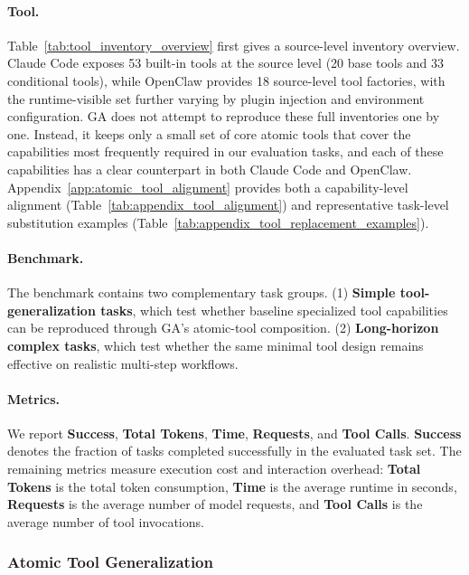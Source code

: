 \paragraph{Tool.}
Table~\ref{tab:tool_inventory_overview} first gives a source-level inventory overview. Claude Code exposes 53 built-in tools at the source level (20 base tools and 33 conditional tools), while OpenClaw provides 18 source-level tool factories, with the runtime-visible set further varying by plugin injection and environment configuration. GA does not attempt to reproduce these full inventories one by one. Instead, it keeps only a small set of core atomic tools that cover the capabilities most frequently required in our evaluation tasks, and each of these capabilities has a clear counterpart in both Claude Code and OpenClaw. Appendix~\ref{app:atomic_tool_alignment} provides both a capability-level alignment (Table~\ref{tab:appendix_tool_alignment}) and representative task-level substitution examples (Table~\ref{tab:appendix_tool_replacement_examples}).


\paragraph{Benchmark.}
The benchmark contains two complementary task groups. (1) \textbf{Simple tool-generalization tasks}, which test whether baseline specialized tool capabilities can be reproduced through GA's atomic-tool composition. (2) \textbf{Long-horizon complex tasks}, which test whether the same minimal tool design remains effective on realistic multi-step workflows.

\paragraph{Metrics.}
We report \textbf{Success}, \textbf{Total Tokens}, \textbf{Time}, \textbf{Requests}, and \textbf{Tool Calls}. \textbf{Success} denotes the fraction of tasks completed successfully in the evaluated task set. The remaining metrics measure execution cost and interaction overhead: \textbf{Total Tokens} is the total token consumption, \textbf{Time} is the average runtime in seconds, \textbf{Requests} is the average number of model requests, and \textbf{Tool Calls} is the average number of tool invocations.

\subsubsection{Atomic Tool Generalization}
\label{sec:exp_atomic_tool_generalization}

